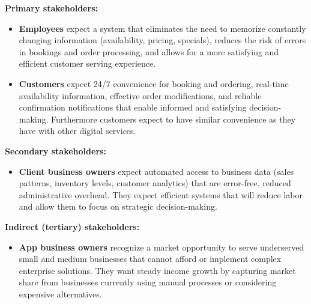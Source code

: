 \documentclass[]{VUMIFTemplateClass}
\begin{document}




\textbf{Primary stakeholders:}
\begin{itemize}
    \item \textbf{Employees} expect a system that eliminates the need to
    memorize constantly changing information (availability, pricing, specials),
    reduces the risk of errors in bookings and order processing, and allows for
    a more satisfying and efficient customer serving experience.
    \item \textbf{Customers} expect 24/7 convenience for booking and ordering,
    real-time availability information, effective order modifications, and
    reliable confirmation notifications that enable informed and satisfying
    decision-making. Furthermore customers expect to have similar convenience as
    they have with other digital services.
\end{itemize}

\textbf{Secondary stakeholders:}
\begin{itemize}
    \item \textbf{Client business owners} expect automated access to business
    data (sales patterns, inventory levels, customer analytics) that are
    error-free, reduced administrative overhead. They expect efficient systems
    that will reduce labor and allow them to focus on strategic decision-making.
\end{itemize}

\textbf{Indirect (tertiary) stakeholders:}
\begin{itemize}
    \item \textbf{App business owners} recognize a market opportunity to serve
    underserved small and medium businesses that cannot afford or implement
    complex enterprise solutions. They want steady income growth by capturing
    market share from businesses currently using manual processes or considering
    expensive alternatives.
\end{itemize}
\end{document}

